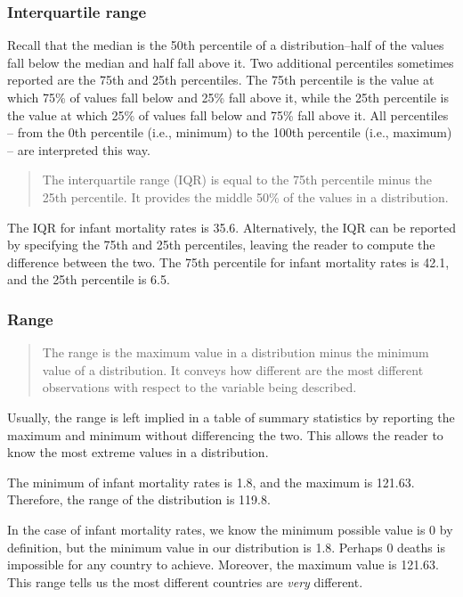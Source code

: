 \documentclass[
]{book}
\begin{document}
\hypertarget{interquartile-range}{%
\subsubsection*{Interquartile range}\label{interquartile-range}}


Recall that the median is the 50th percentile of a distribution--half of the values fall below the median and half fall above it. Two additional percentiles sometimes reported are the 75th and 25th percentiles. The 75th percentile is the value at which 75\% of values fall below and 25\% fall above it, while the 25th percentile is the value at which 25\% of values fall below and 75\% fall above it. All percentiles -- from the 0th percentile (i.e., minimum) to the 100th percentile (i.e., maximum) -- are interpreted this way.

\begin{quote}
The interquartile range (IQR) is equal to the 75th percentile minus the 25th percentile. It provides the middle 50\% of the values in a distribution.
\end{quote}

The IQR for infant mortality rates is 35.6. Alternatively, the IQR can be reported by specifying the 75th and 25th percentiles, leaving the reader to compute the difference between the two. The 75th percentile for infant mortality rates is 42.1, and the 25th percentile is 6.5.

\hypertarget{range}{%
\subsubsection*{Range}\label{range}}


\begin{quote}
The range is the maximum value in a distribution minus the minimum value of a distribution. It conveys how different are the most different observations with respect to the variable being described.
\end{quote}

Usually, the range is left implied in a table of summary statistics by reporting the maximum and minimum without differencing the two. This allows the reader to know the most extreme values in a distribution.

The minimum of infant mortality rates is 1.8, and the maximum is 121.63. Therefore, the range of the distribution is 119.8.

In the case of infant mortality rates, we know the minimum possible value is 0 by definition, but the minimum value in our distribution is 1.8. Perhaps 0 deaths is impossible for any country to achieve. Moreover, the maximum value is 121.63. This range tells us the most different countries are \emph{very} different.
\end{document}
